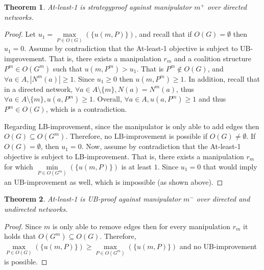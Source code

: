 \documentclass{article}
\newtheorem{theorem}{Theorem}
\begin{document}
\begin{theorem}
\label{thrm:least1_add_dir}
At-least-1 is strategyproof against manipulator $m^+$ over directed networks.
\end{theorem}
\begin{proof}
Let $u_1=\underset{P\in O(G)}{\max}(\{u(m,P)\})$, and recall that if $O(G) = \emptyset$ then $u_1=0$.
Assume by contradiction that the At-least-1 objective is subject to UB-improvement.
That is, there exists a manipulation $r_{m}$ and a coalition structure $P^m\in O(G^{m})$ such that $u(m,P^m) > u_1$. That is $P^m\notin O(G)$, and $\forall a \in A, |N^m(a)| \geq 1$.
Since $u_1 \geq 0$ then $u(m,P^m) \geq 1$. 
In addition, recall that in a directed network, $\forall a \in A \setminus \{m\}, N(a)=N^m(a)$, thus $\forall a \in A \setminus \{m\}, u(a,P^m) \geq 1$.
Overall, $\forall a \in A, u(a,P^m) \geq 1$ and thus $P^m \in O(G)$, which is a contradiction.



Regarding  LB-improvement, since the manipulator is only able to add edges then $O(G) \subseteq O(G^m)$. Therefore, no LB-improvement is possible if $O(G) \neq \emptyset$. 
If $O(G) = \emptyset$, then $u_1=0$. Now, assume by contradiction that the At-least-1 objective is subject to LB-improvement. That is, there exists a manipulation $r_{m}$ for which $\underset{P\in O(G^m)}{\min}(\{u(m,P)\})$ is at least $1$. Since $u_1=0$ that would imply an UB-improvement as well, which is impossible (as shown above).
\end{proof}

\begin{theorem}
\label{thrm:least1_remove}
At-least-1 is UB-proof against manipulator $m^-$ over directed and undirected networks.
\end{theorem}
\begin{proof}
Since $m$ is only able to remove edges then for every manipulation $r_m$ it holds that $O(G^m) \subseteq O(G)$. Therefore, $\underset{P\in O(G)}{\max}(\{u(m,P)\})\geq \underset{P\in O(G^m)}{\max}(\{u(m,P)\}) $ and no UB-improvement is possible. 
\end{proof}
\end{document}
